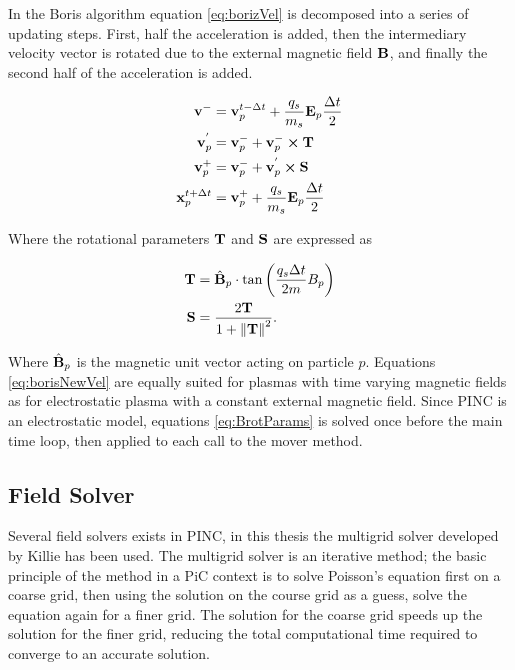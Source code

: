 In the Boris algorithm equation \eqref{eq:borizVel} is decomposed into a series of updating steps. First, half the acceleration is added, then the intermediary velocity vector is rotated due to the external magnetic field $\vb{B}$, and finally the second half of the acceleration is added.

\begin{subequations}\label{eq:borisNewVel}
    \begin{align}
        \vb{v}^{-} &= \vb{v}^{t-\Delta t}_p + \frac{q_s}{m_s} \vb{E}_p \frac{\Delta t}{2} \\
        \vb{v}^{'}_p &= \vb{v}^{-}_p + \vb{v}^{-}_p \cross \vb{T} \\
        \vb{v}^{+}_p &= \vb{v}^{-}_p + \vb{v}^{'}_p \cross \vb{S} \\
        \vb{x}^{t+\Delta t}_p &= \vb{v}^{+}_p + \frac{q_s}{m_s} \vb{E}_p \frac{\Delta t}{2} 
    \end{align}
\end{subequations}

Where the rotational parameters $\vb{T}$ and $\vb{S}$ are expressed as

\begin{subequations}\label{eq:BrotParams}
    \begin{align}
        \vb{T} &= \hat{\vb{B}}_p \cdot \tan\left(\frac{q_s \Delta t}{2m} B_p \right) \\
        \vb{S} &= \frac{2 \vb{T}}{1 + \norm{\vb{T}}^2}. 
    \end{align}
\end{subequations}

Where $\hat{\vb{B}}_p$ is the magnetic unit vector acting on particle $p$. Equations \eqref{eq:borisNewVel} are equally suited for plasmas with time varying magnetic fields as for electrostatic plasma with a constant external magnetic field. Since PINC is an electrostatic model, equations \eqref{eq:BrotParams} is solved once before the main time loop, then applied to each call to the mover method.

\subsection{Field Solver}
Several field solvers exists in PINC, in this thesis the multigrid solver developed by Killie \parencite{Killie} has been used. The multigrid solver is an iterative method; the basic principle of the method in a PiC context is to solve Poisson's equation first on a coarse grid, then using the solution on the course grid as a guess, solve the equation again for a finer grid. The solution for the coarse grid speeds up the solution for the finer grid, reducing the total computational time required to converge to an accurate solution. 

